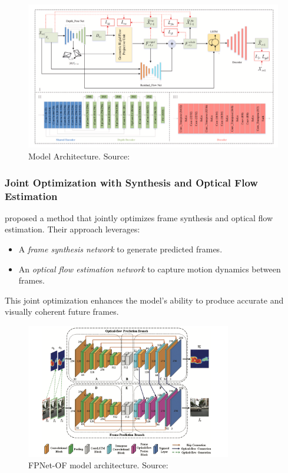 \documentclass[12pt,oneside]{book} %
\begin{document}
\begin{figure}[H]
    \centering
    \includegraphics[width=1\textwidth]{figures/Unsupervised-Video-Forecasting.png}
    \caption{Model Architecture. Source:~\citet{UnsupervisedVideoForecastingFlowParsingMechanism}}\label{fig:unsupervised-video-forecasting-flow-parsing}
\end{figure}

\subsubsection*{Joint Optimization with Synthesis and Optical Flow Estimation}
\citet{VideoFramePredictionByJointOptimizationWithSynthesisAndOpticalFlowEstimation}
proposed a method that jointly optimizes frame synthesis and optical flow
estimation. Their approach leverages:
\begin{itemize}
    \item A \textit{frame synthesis network} to generate predicted frames.
    \item An \textit{optical flow estimation network} to capture motion dynamics between
          frames.
\end{itemize}
This joint optimization enhances the model's ability to produce accurate and visually coherent future frames.

\begin{figure}[H]
    \centering
    \includegraphics[width=0.8\textwidth]{figures/FPNet-OF.png}
    \caption{FPNet-OF model architecture. Source:~\citet{VideoFramePredictionByJointOptimizationWithSynthesisAndOpticalFlowEstimation}}\label{fig:joint-optimization-synthesis-optical-flow}
\end{figure}
\end{document}
